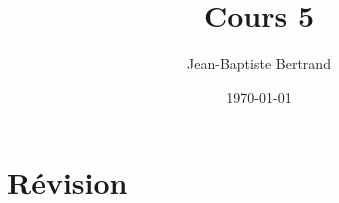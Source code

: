 \documentclass{article}
\title{Cours 5}
\author{Jean-Baptiste Bertrand}
\date{\today}
\begin{document}
\maketitle

\section{Révision}
\end{document}
